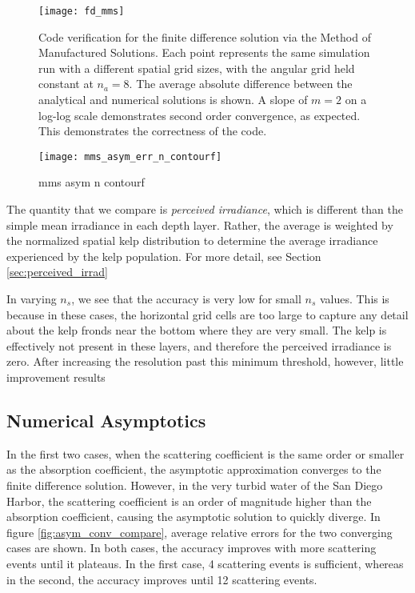 \begin{figure}[H]
  \centering
  \texttt{[image: fd\_mms]}
  \caption{Code verification for the finite difference solution via the Method of Manufactured Solutions. Each point represents the same simulation run with a different spatial grid sizes, with the angular grid held constant at $n_a=8$. The average absolute difference between the analytical and numerical solutions is shown. A slope of $m=2$ on a log-log scale demonstrates second order convergence, as expected. This demonstrates the correctness of the code.}
  \label{fig:fd_mms}
\end{figure}

\begin{figure}[H]
  \centering
  \texttt{[image: mms\_asym\_err\_n\_contourf]}
  \caption{mms asym n contourf}
  \label{fig:mms_asym_err_n_contourf}
\end{figure}

The quantity that we compare is \textit{perceived irradiance}, which is different than the simple mean irradiance in each depth layer.
Rather, the average is weighted by the normalized spatial kelp distribution to determine the average irradiance experienced by the kelp population.
For more detail, see Section \ref{sec:perceived_irrad}

In varying $n_s$, we see that the accuracy is very low for small $n_s$ values.
This is because in these cases, the horizontal grid cells are too large to capture any detail
about the kelp fronds near the bottom where they are very small.
The kelp is effectively not present in these layers, and therefore the perceived irradiance is zero.
After increasing the resolution past this minimum threshold, however, little improvement results

\subsection{Numerical Asymptotics}

In the first two cases, when the scattering coefficient is the same order or smaller as the absorption coefficient,
the asymptotic approximation converges to the finite difference solution.
However, in the very turbid water of the San Diego Harbor, the scattering coefficient is an order of magnitude higher
than the absorption coefficient, causing the asymptotic solution to quickly diverge.
In figure \ref{fig:asym_conv_compare}, average relative errors for the two converging cases are shown.
In both cases, the accuracy improves with more scattering events until it plateaus.
In the first case, 4 scattering events is sufficient, whereas in the second, the accuracy improves until 12 scattering events.

